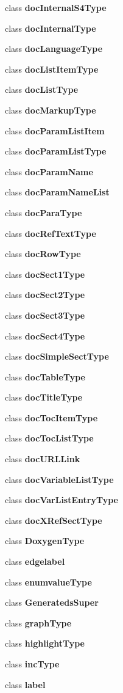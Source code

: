 \begin{DoxyCompactItemize}
class {\bf doc\+Internal\+S4\+Type}
\item 
class {\bf doc\+Internal\+Type}
\item 
class {\bf doc\+Language\+Type}
\item 
class {\bf doc\+List\+Item\+Type}
\item 
class {\bf doc\+List\+Type}
\item 
class {\bf doc\+Markup\+Type}
\item 
class {\bf doc\+Param\+List\+Item}
\item 
class {\bf doc\+Param\+List\+Type}
\item 
class {\bf doc\+Param\+Name}
\item 
class {\bf doc\+Param\+Name\+List}
\item 
class {\bf doc\+Para\+Type}
\item 
class {\bf doc\+Ref\+Text\+Type}
\item 
class {\bf doc\+Row\+Type}
\item 
class {\bf doc\+Sect1\+Type}
\item 
class {\bf doc\+Sect2\+Type}
\item 
class {\bf doc\+Sect3\+Type}
\item 
class {\bf doc\+Sect4\+Type}
\item 
class {\bf doc\+Simple\+Sect\+Type}
\item 
class {\bf doc\+Table\+Type}
\item 
class {\bf doc\+Title\+Type}
\item 
class {\bf doc\+Toc\+Item\+Type}
\item 
class {\bf doc\+Toc\+List\+Type}
\item 
class {\bf doc\+U\+R\+L\+Link}
\item 
class {\bf doc\+Variable\+List\+Type}
\item 
class {\bf doc\+Var\+List\+Entry\+Type}
\item 
class {\bf doc\+X\+Ref\+Sect\+Type}
\item 
class {\bf Doxygen\+Type}
\item 
class {\bf edgelabel}
\item 
class {\bf enumvalue\+Type}
\item 
class {\bf Generateds\+Super}
\item 
class {\bf graph\+Type}
\item 
class {\bf highlight\+Type}
\item 
class {\bf inc\+Type}
\item 
class {\bf label}
\item 

\end{DoxyCompactItemize}

